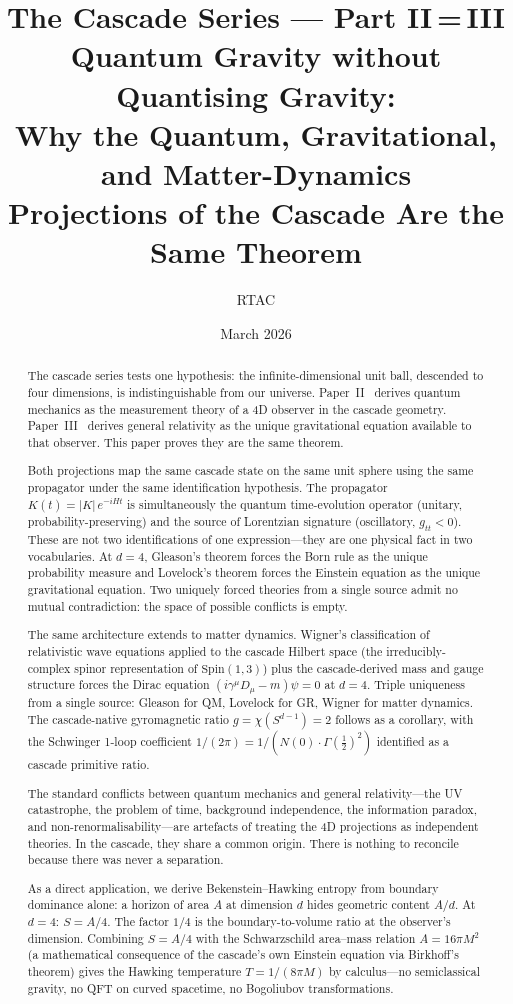 \documentclass[12pt,a4paper]{article}
\title{\textbf{The Cascade Series --- Part II\,=\,III}\\[6pt]
Quantum Gravity without Quantising Gravity:\\
Why the Quantum, Gravitational, and Matter-Dynamics\\
Projections of the Cascade Are the Same Theorem}
\author{RTAC}
\date{March 2026}
\begin{document}
\setlength{\emergencystretch}{3em}
\maketitle
{}
\label{paperdoc}

\begin{abstract}
The cascade series tests one hypothesis: the infinite-dimensional unit ball,
descended to four dimensions, is indistinguishable from our universe.
Paper~II~\cite{part2} derives quantum mechanics as the measurement theory of
a 4D observer in the cascade geometry. Paper~III~\cite{part3} derives general
relativity as the unique gravitational equation available to that observer.
This paper proves they are the same theorem.

Both projections map the same cascade state on the same unit sphere using the
same propagator under the same identification hypothesis. The propagator
$K(t) = |K|\,e^{-iHt}$ is simultaneously the quantum time-evolution operator
(unitary, probability-preserving) and the source of Lorentzian signature
(oscillatory, $g_{tt} < 0$). These are not two identifications of one
expression---they are one physical fact in two vocabularies. At $d = 4$,
Gleason's theorem forces the Born rule as the unique probability measure and
Lovelock's theorem forces the Einstein equation as the unique gravitational
equation. Two uniquely forced theories from a single source admit no mutual
contradiction: the space of possible conflicts is empty.

The same architecture extends to matter dynamics. Wigner's classification of
relativistic wave equations applied to the cascade Hilbert space (the
irreducibly-complex spinor representation of $\mathrm{Spin}(1,3)$) plus the
cascade-derived mass and gauge structure forces the Dirac equation
$(i\gamma^\mu D_\mu - m)\psi = 0$ at $d=4$. Triple uniqueness from a single
source: Gleason for QM, Lovelock for GR, Wigner for matter dynamics. The
cascade-native gyromagnetic ratio $g = \chi(S^{d-1}) = 2$ follows as a
corollary, with the Schwinger 1-loop coefficient $1/(2\pi) = 1/(N(0)\cdot
\Gamma(\tfrac{1}{2})^2)$ identified as a cascade primitive ratio.

The standard conflicts between quantum mechanics and general relativity---the
UV catastrophe, the problem of time, background independence, the information
paradox, and non-renormalisability---are artefacts of treating the 4D
projections as independent theories. In the cascade, they share a common
origin. There is nothing to reconcile because there was never a separation.

As a direct application, we derive Bekenstein--Hawking entropy from boundary
dominance alone: a horizon of area $A$ at dimension $d$ hides geometric content
$A/d$. At $d = 4$: $S = A/4$. The factor $1/4$ is the boundary-to-volume
ratio at the observer's dimension. Combining $S = A/4$ with the
Schwarzschild area--mass relation $A = 16\pi M^2$ (a mathematical consequence
of the cascade's own Einstein equation via Birkhoff's theorem) gives the
Hawking temperature $T = 1/(8\pi M)$ by calculus---no semiclassical gravity,
no QFT on curved spacetime, no Bogoliubov transformations.
\end{abstract}
\end{document}
